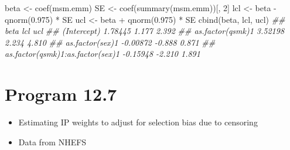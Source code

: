 \documentclass[
  10pt,
  a4paper,
]{book}
\newenvironment{Shaded}{\begin{snugshade}}{\end{snugshade}}
\newcommand{\DecValTok}[1]{\textcolor[rgb]{0.68,0.00,0.00}{#1}}
\newcommand{\DocumentationTok}[1]{\textcolor[rgb]{0.37,0.37,0.37}{\textit{#1}}}
\newcommand{\FloatTok}[1]{\textcolor[rgb]{0.68,0.00,0.00}{#1}}
\newcommand{\FunctionTok}[1]{\textcolor[rgb]{0.28,0.35,0.67}{#1}}
\newcommand{\NormalTok}[1]{\textcolor[rgb]{0.00,0.46,0.62}{#1}}
\newcommand{\OtherTok}[1]{\textcolor[rgb]{0.00,0.46,0.62}{#1}}
\newcommand{\SpecialCharTok}[1]{\textcolor[rgb]{0.37,0.37,0.37}{#1}}
\providecommand{\tightlist}{%
  \setlength{\itemsep}{0pt}\setlength{\parskip}{0pt}}
\begin{document}
\begin{Shaded}
\begin{Highlighting}[]
\NormalTok{beta }\OtherTok{\textless{}{-}} \FunctionTok{coef}\NormalTok{(msm.emm)}
\NormalTok{SE }\OtherTok{\textless{}{-}} \FunctionTok{coef}\NormalTok{(}\FunctionTok{summary}\NormalTok{(msm.emm))[, }\DecValTok{2}\NormalTok{]}
\NormalTok{lcl }\OtherTok{\textless{}{-}}\NormalTok{ beta }\SpecialCharTok{{-}} \FunctionTok{qnorm}\NormalTok{(}\FloatTok{0.975}\NormalTok{) }\SpecialCharTok{*}\NormalTok{ SE}
\NormalTok{ucl }\OtherTok{\textless{}{-}}\NormalTok{ beta }\SpecialCharTok{+} \FunctionTok{qnorm}\NormalTok{(}\FloatTok{0.975}\NormalTok{) }\SpecialCharTok{*}\NormalTok{ SE}
\FunctionTok{cbind}\NormalTok{(beta, lcl, ucl)}
\DocumentationTok{\#\#                                      beta    lcl   ucl}
\DocumentationTok{\#\# (Intercept)                       1.78445  1.177 2.392}
\DocumentationTok{\#\# as.factor(qsmk)1                  3.52198  2.234 4.810}
\DocumentationTok{\#\# as.factor(sex)1                  {-}0.00872 {-}0.888 0.871}
\DocumentationTok{\#\# as.factor(qsmk)1:as.factor(sex)1 {-}0.15948 {-}2.210 1.891}
\end{Highlighting}
\end{Shaded}

\hypertarget{program-12.7}{%
\section{Program 12.7}\label{program-12.7}}

\begin{itemize}
\tightlist
\item
  Estimating IP weights to adjust for selection bias due to censoring
\item
  Data from NHEFS
\end{itemize}
\end{document}
